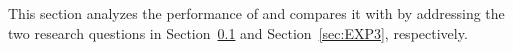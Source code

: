 This section analyzes the performance of \TF and compares it with \MNB by addressing the two research questions in Section~\ref{sec:EXP1} and Section~\ref{sec:EXP3}, respectively.



\subsection{\rqfirst} \label{sec:EXP1}
  
